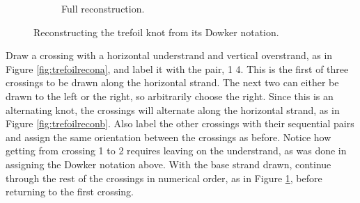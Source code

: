 \documentclass[titlepage,11pt]{article}
\begin{document}
\begin{figure}[h!]
\begin{subfigure}[b]{0.3\linewidth}
        \vspace{-0.8em}
        \caption{Full reconstruction.}
        \label{fig:trefoilreconc}
    \end{subfigure}
    \caption{Reconstructing the trefoil knot from its Dowker notation.}
    \label{fig:trefoilrecon}
\end{figure}

Draw a crossing with a horizontal understrand and vertical overstrand, as in Figure \ref{fig:trefoilrecona}, and label it with the pair, 1 4. This is the first of three crossings to be drawn along the horizontal strand. The next two can either be drawn to the left or the right, so arbitrarily choose the right. Since this is an alternating knot, the crossings will alternate along the horizontal strand, as in Figure \ref{fig:trefoilreconb}. Also label the other crossings with their sequential pairs and assign the same orientation between the crossings as before. Notice how getting from crossing 1 to 2 requires leaving on the understrand, as was done in assigning the Dowker notation above. With the base strand drawn, continue through the rest of the crossings in numerical order, as in Figure \ref{fig:trefoilreconc}, before returning to the first crossing.\par
\end{document}
